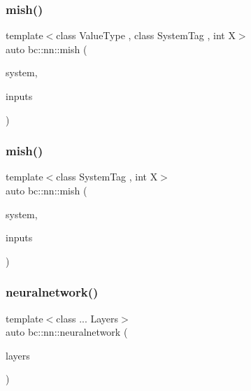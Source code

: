 \mbox{\label{namespacebc_1_1nn_a65e90e567d7f2dc29cf67f9885b17811}} 
\subsubsection{\texorpdfstring{mish()}{mish()}\hspace{0.1cm}{\footnotesize\ttfamily [4/5]}}
{\footnotesize\ttfamily template$<$class Value\+Type , class System\+Tag , int X$>$ \\
auto bc\+::nn\+::mish (\begin{DoxyParamCaption}\item[{System\+Tag}]{system,  }\item[{\hyperlink{structbc_1_1Dim}{bc\+::\+Dim}$<$ X $>$}]{inputs }\end{DoxyParamCaption})}

\mbox{\label{namespacebc_1_1nn_afb1231c7a3de4aec64f3de944173df84}} 
\subsubsection{\texorpdfstring{mish()}{mish()}\hspace{0.1cm}{\footnotesize\ttfamily [5/5]}}
{\footnotesize\ttfamily template$<$class System\+Tag , int X$>$ \\
auto bc\+::nn\+::mish (\begin{DoxyParamCaption}\item[{System\+Tag}]{system,  }\item[{\hyperlink{structbc_1_1Dim}{bc\+::\+Dim}$<$ X $>$}]{inputs }\end{DoxyParamCaption})}

\mbox{\label{namespacebc_1_1nn_aed1958e9d71be2ebdf0c51c26e97b947}} 
\subsubsection{\texorpdfstring{neuralnetwork()}{neuralnetwork()}}
{\footnotesize\ttfamily template$<$class ... Layers$>$ \\
auto bc\+::nn\+::neuralnetwork (\begin{DoxyParamCaption}\item[{Layers ...}]{layers }\end{DoxyParamCaption})}



